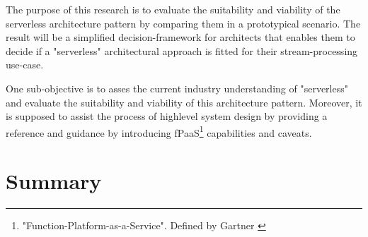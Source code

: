 The purpose of this research is to evaluate the suitability and viability of the serverless architecture pattern by comparing them in a prototypical scenario. The result will be a simplified decision-framework for architects that enables them to decide if a "serverless" architectural approach is fitted for their stream-processing use-case.

One sub-objective is to asses the current industry understanding of "serverless" and evaluate the suitability and viability of this architecture pattern.
Moreover, it is supposed to assist the process of highlevel system design by providing a reference and guidance by introducing fPaaS\footnote{"Function-Platform-as-a-Service". Defined by Gartner \autocite{Chandrasekaran2017EvolutionWhen}} capabilities and caveats.

\section{Summary}
